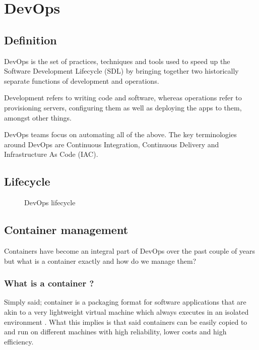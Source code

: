 \section{DevOps}

\subsection{Definition}
DevOps is the set of practices, techniques and tools used to speed up the Software Development Lifecycle (SDL) by bringing together two historically separate functions of development and operations.

\medskip
Development refers to writing code and software, whereas operations refer to provisioning servers, configuring them as well as deploying the apps to them, amongst other things.

\medskip
DevOps teams focus on automating all of the above.
The key terminologies around DevOps are Continuous Integration, Continuous Delivery and Infrastructure As Code (IAC).

\subsection{Lifecycle}
\begin{figure}[H]
    \centering
    \caption{DevOps lifecycle}
    \label{fig:devops-lifecycle}
\end{figure}
\subsection{Container management}
Containers have become an integral part of DevOps over the past couple of years but what is a container exactly and how do we manage them?
\subsubsection*{What is a container ?}
Simply said; container is a packaging format for software applications that are akin to a very lightweight virtual machine which always executes in an isolated environment \cite{what-is-a-container}.
What this implies is that said containers can be easily copied to and run on different machines with high reliability, lower costs and high efficiency.
